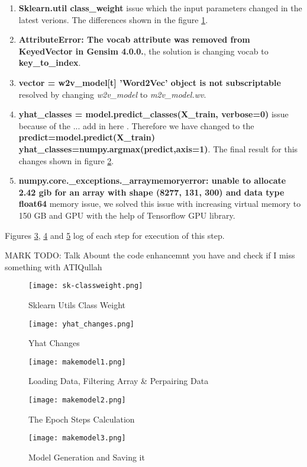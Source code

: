 \begin{enumerate}

    \item \textbf{Sklearn.util class\_weight} issue which the input parameters changed in the latest verions. The differences shown in the figure \ref{fig:sklearn_class_wight}.
    \item \textbf{AttributeError: The vocab attribute was removed from KeyedVector in Gensim 4.0.0.}, the solution is changing vocab to \textbf{key\_to\_index}.
    \item \textbf{vector = w2v\_model[t] 'Word2Vec' object is not subscriptable} resolved by changing \textit{w2v\_model} to \textit{m2v\_model.wv}.
    \item \textbf{yhat\_classes = model.predict\_classes(X\_train, verbose=0)} issue because of the ... add in here . 
    Therefore we have changed to the \textbf{predict=model.predict(X\_train) yhat\_classes=numpy.argmax(predict,axis=1)}. 
    The final result for this changes shown in figure \ref{fig:yhat_changes}.
    \item \textbf{numpy.core.\_exceptions.\_arraymemoryerror: unable to allocate 2.42 gib for an array with shape (8277, 131, 300) and data type float64} memory issue, we solved this issue with increasing virtual memory to 150 GB and GPU with the help of Tensorflow GPU library.

\end{enumerate}

Figures \ref{fig:makemodel1}, \ref{fig:makemodel2} and \ref{fig:makemodel3} log of each step for execution of this step. 

MARK TODO: Talk Abount the code enhancemnt you have and check if I miss something with ATIQullah

\begin{figure}
    \centering
    \texttt{[image: sk-classweight.png]}
    \caption{Sklearn Utils Class Weight}
    \label{fig:sklearn_class_wight}
\end{figure}

\begin{figure}
    \centering
    \texttt{[image: yhat\_changes.png]}
    \caption{Yhat Changes}
    \label{fig:yhat_changes}
\end{figure}

\begin{figure}
    \centering
    \texttt{[image: makemodel1.png]}
    \caption{Loading Data, Filtering Array \& Perpairing Data}
    \label{fig:makemodel1}
\end{figure}

\begin{figure}
    \centering
    \texttt{[image: makemodel2.png]}
    \caption{The Epoch Steps Calculation}
    \label{fig:makemodel2}
\end{figure}
\begin{figure}
    \centering
    \texttt{[image: makemodel3.png]}
    \caption{Model Generation and Saving it}
    \label{fig:makemodel3}
\end{figure}
